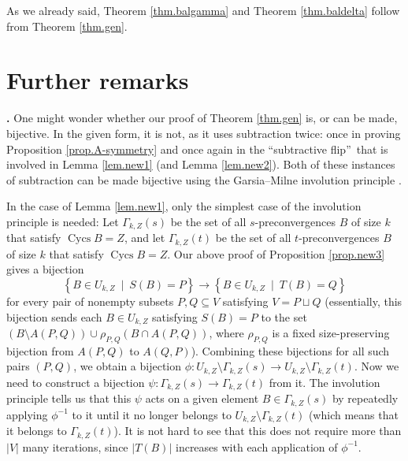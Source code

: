 \documentclass[numbers=enddot,12pt,final,onecolumn,notitlepage]{scrartcl}%
\theoremstyle{definition}
\theoremstyle{plainsl}
\begin{document}
As we already said, Theorem \ref{thm.balgamma} and Theorem \ref{thm.baldelta}
follow from Theorem \ref{thm.gen}.

\section{Further remarks}

\textbf{.} One might wonder whether our proof of Theorem \ref{thm.gen}
is, or can be made, bijective. In the given form, it is not, as it uses
subtraction twice: once in proving Proposition \ref{prop.A-symmetry} and once
again in the \textquotedblleft subtractive flip\textquotedblright\ that is
involved in Lemma \ref{lem.new1} (and Lemma \ref{lem.new2}). Both of these
instances of subtraction can be made bijective using the Garsia--Milne
involution principle \cite[\S 4.6]{StaWhi86}.

In the case of Lemma \ref{lem.new1}, only the simplest case of the involution
principle is needed: Let $\Gamma_{k,Z}\left(  s\right)  $ be the set of all
$s$-preconvergences $B$ of size $k$ that satisfy $\operatorname*{Cycs}B=Z$,
and let $\Gamma_{k,Z}\left(  t\right)  $ be the set of all $t$-preconvergences
$B$ of size $k$ that satisfy $\operatorname*{Cycs}B=Z$. Our above proof of
Proposition \ref{prop.new3} gives a bijection%
\[
\left\{  B\in U_{k,Z}\ \mid\ S\left(  B\right)  =P\right\}  \rightarrow
\left\{  B\in U_{k,Z}\ \mid\ T\left(  B\right)  =Q\right\}
\]
for every pair of nonempty subsets $P,Q\subseteq V$ satisfying $V=P\sqcup Q$
(essentially, this bijection sends each $B\in U_{k,Z}$ satisfying $S\left(
B\right)  =P$ to the set $\left(  B\setminus A\left(  P,Q\right)  \right)
\cup\rho_{P,Q}\left(  B\cap A\left(  P,Q\right)  \right)  $, where $\rho
_{P,Q}$ is a fixed size-preserving bijection from $A\left(  P,Q\right)  $ to
$A\left(  Q,P\right)  $). Combining these bijections for all such pairs
$\left(  P,Q\right)  $, we obtain a bijection $\phi:U_{k,Z}\setminus
\Gamma_{k,Z}\left(  s\right)  \rightarrow U_{k,Z}\setminus\Gamma_{k,Z}\left(
t\right)  $. Now we need to construct a bijection $\psi:\Gamma_{k,Z}\left(
s\right)  \rightarrow\Gamma_{k,Z}\left(  t\right)  $ from it. The involution
principle tells us that this $\psi$ acts on a given element $B\in\Gamma
_{k,Z}\left(  s\right)  $ by repeatedly applying $\phi^{-1}$ to it until it no
longer belongs to $U_{k,Z}\setminus\Gamma_{k,Z}\left(  t\right)  $ (which
means that it belongs to $\Gamma_{k,Z}\left(  t\right)  $). It is not hard to
see that this does not require more than $\left\vert V\right\vert $ many
iterations, since $\left\vert T\left(  B\right)  \right\vert $ increases with
each application of $\phi^{-1}$.
\end{document}
